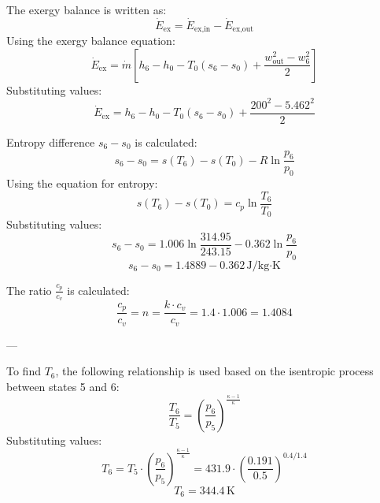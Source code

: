 The exergy balance is written as:  
\[
\dot{E}_{\text{ex}} = \dot{E}_{\text{ex,in}} - \dot{E}_{\text{ex,out}}
\]  
Using the exergy balance equation:  
\[
\dot{E}_{\text{ex}} = \dot{m} \left[ h_6 - h_0 - T_0 (s_6 - s_0) + \frac{w_{\text{out}}^2 - w_6^2}{2} \right]
\]  
Substituting values:  
\[
\dot{E}_{\text{ex}} = h_6 - h_0 - T_0 (s_6 - s_0) + \frac{200^2 - 5.462^2}{2}
\]  

Entropy difference \( s_6 - s_0 \) is calculated:  
\[
s_6 - s_0 = s(T_6) - s(T_0) - R \ln \frac{p_6}{p_0}
\]  
Using the equation for entropy:  
\[
s(T_6) - s(T_0) = c_p \ln \frac{T_6}{T_0}
\]  
Substituting values:  
\[
s_6 - s_0 = 1.006 \ln \frac{314.95}{243.15} - 0.362 \ln \frac{p_6}{p_0}
\]  
\[
s_6 - s_0 = 1.4889 - 0.362 \, \text{J/kg·K}
\]  

The ratio \( \frac{c_p}{c_v} \) is calculated:  
\[
\frac{c_p}{c_v} = n = \frac{k \cdot c_v}{c_v} = 1.4 \cdot 1.006 = 1.4084
\]  

---

To find \( T_6 \), the following relationship is used based on the isentropic process between states 5 and 6:  
\[
\frac{T_6}{T_5} = \left( \frac{p_6}{p_5} \right)^{\frac{\kappa - 1}{\kappa}}
\]  
Substituting values:  
\[
T_6 = T_5 \cdot \left( \frac{p_6}{p_5} \right)^{\frac{\kappa - 1}{\kappa}} = 431.9 \cdot \left( \frac{0.191}{0.5} \right)^{0.4 / 1.4}
\]  
\[
T_6 = 344.4 \, \text{K}
\]